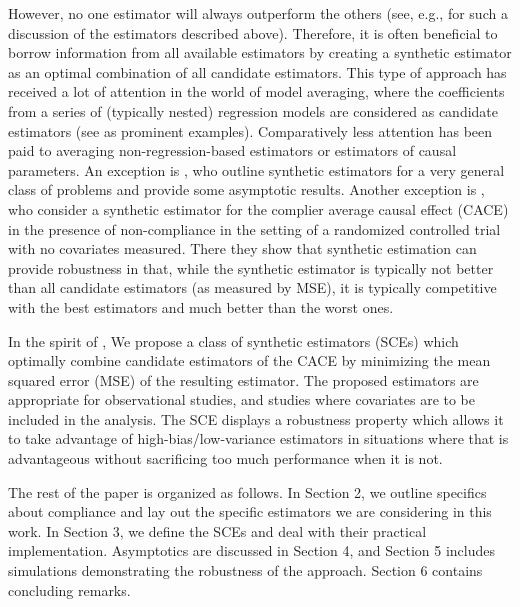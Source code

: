 \documentclass{article}
\begin{document}
However, no one estimator will always outperform the others (see, e.g., \cite{Little2018, antonelli2017synthetic} for such a discussion of the estimators described above). Therefore, it is often beneficial to borrow information from all available estimators by creating a synthetic estimator as an optimal combination of all candidate estimators. This type of approach has received a lot of attention in the world of model averaging, where the coefficients from a series of (typically nested) regression models are considered as candidate estimators (see \cite{hjort2003frequentist, hansen2007least} as prominent examples). Comparatively less attention has been paid to averaging non-regression-based estimators or estimators of causal parameters. An exception is \cite{lavancier2016general}, who outline synthetic estimators for a very general class of problems and provide some asymptotic results. Another exception is \citet{antonelli2017synthetic}, who consider a synthetic estimator for the complier average causal effect (CACE) in the presence of non-compliance in the setting of a randomized controlled trial with no covariates measured. There they show that synthetic estimation can provide robustness in that, while the synthetic estimator is typically not better than all candidate estimators (as measured by MSE), it is typically competitive with the best estimators and much better than the worst ones. 

In the spirit of \citet{antonelli2017synthetic}, We propose a class of synthetic estimators (SCEs) which optimally combine candidate estimators of the CACE by minimizing the mean squared error (MSE) of the resulting estimator. The proposed estimators are appropriate for observational studies, and studies where covariates are to be included in the analysis.  The SCE displays a robustness property which allows it to take advantage of high-bias/low-variance estimators in situations where that is advantageous without sacrificing too  much performance when it is not. %

The rest of the paper is organized as follows. In Section 2, we outline specifics about compliance and lay out the specific estimators we are considering in this work. In Section 3, we define the SCEs and deal with their practical implementation. Asymptotics are discussed in Section 4, and Section 5 includes simulations demonstrating the robustness of the approach. Section 6 contains concluding remarks.
\end{document}
